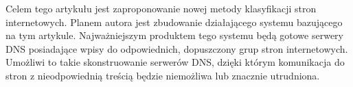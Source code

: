\documentclass[10pt,twoside,a4paper]{article}
\begin{document}
Celem tego artykułu jest zaproponowanie nowej metody klasyfikacji stron internetowych. Planem autora jest zbudowanie działającego systemu bazującego na tym artykule. Najważniejszym produktem tego systemu będą gotowe serwery DNS posiadające wpisy do odpowiednich, dopuszczony grup stron internetowych. Umożliwi to takie skonstruowanie serwerów DNS, dzięki którym komunikacja do stron z nieodpowiednią treścią będzie niemożliwa lub znacznie utrudniona.







\end{document}
